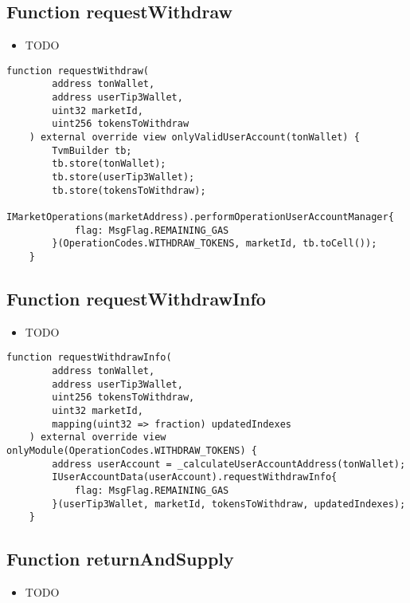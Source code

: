 \subsection{Function requestWithdraw}

\noindent\begin{itemize}
\item TODO
\end{itemize}

\begin{lstlisting}[firstnumber=166]
    function requestWithdraw(
        address tonWallet, 
        address userTip3Wallet, 
        uint32 marketId, 
        uint256 tokensToWithdraw
    ) external override view onlyValidUserAccount(tonWallet) {
        TvmBuilder tb;
        tb.store(tonWallet);
        tb.store(userTip3Wallet);
        tb.store(tokensToWithdraw);
        IMarketOperations(marketAddress).performOperationUserAccountManager{
            flag: MsgFlag.REMAINING_GAS
        }(OperationCodes.WITHDRAW_TOKENS, marketId, tb.toCell());
    }
\end{lstlisting}

\subsection{Function requestWithdrawInfo}

\noindent\begin{itemize}
\item TODO
\end{itemize}

\begin{lstlisting}[firstnumber=181]
    function requestWithdrawInfo(
        address tonWallet, 
        address userTip3Wallet,
        uint256 tokensToWithdraw, 
        uint32 marketId, 
        mapping(uint32 => fraction) updatedIndexes
    ) external override view onlyModule(OperationCodes.WITHDRAW_TOKENS) {
        address userAccount = _calculateUserAccountAddress(tonWallet);
        IUserAccountData(userAccount).requestWithdrawInfo{
            flag: MsgFlag.REMAINING_GAS
        }(userTip3Wallet, marketId, tokensToWithdraw, updatedIndexes);
    }
\end{lstlisting}

\subsection{Function returnAndSupply}

\noindent\begin{itemize}
\item TODO
\end{itemize}


